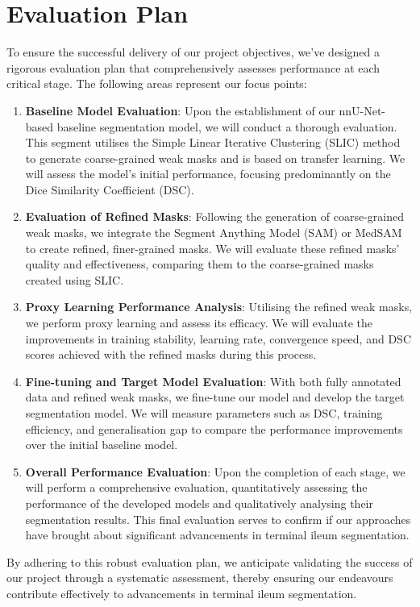 \section{Evaluation Plan}
To ensure the successful delivery of our project objectives, we've designed a rigorous evaluation plan that comprehensively assesses performance at each critical stage. The following areas represent our focus points:

\begin{enumerate}
    \item \textbf{Baseline Model Evaluation}: Upon the establishment of our nnU-Net-based baseline segmentation model, we will conduct a thorough evaluation. This segment utilises the Simple Linear Iterative Clustering (SLIC) method to generate coarse-grained weak masks and is based on transfer learning. We will assess the model's initial performance, focusing predominantly on the Dice Similarity Coefficient (DSC).
    \item \textbf{Evaluation of Refined Masks}: Following the generation of coarse-grained weak masks, we integrate the Segment Anything Model (SAM) or MedSAM to create refined, finer-grained masks. We will evaluate these refined masks' quality and effectiveness, comparing them to the coarse-grained masks created using SLIC.
    \item \textbf{Proxy Learning Performance Analysis}: Utilising the refined weak masks, we perform proxy learning and assess its efficacy. We will evaluate the improvements in training stability, learning rate, convergence speed, and DSC scores achieved with the refined masks during this process.
    \item \textbf{Fine-tuning and Target Model Evaluation}: With both fully annotated data and refined weak masks, we fine-tune our model and develop the target segmentation model. We will measure parameters such as DSC, training efficiency, and generalisation gap to compare the performance improvements over the initial baseline model.
    \item \textbf{Overall Performance Evaluation}: Upon the completion of each stage, we will perform a comprehensive evaluation, quantitatively assessing the performance of the developed models and qualitatively analysing their segmentation results. This final evaluation serves to confirm if our approaches have brought about significant advancements in terminal ileum segmentation.
\end{enumerate}
By adhering to this robust evaluation plan, we anticipate validating the success of our project through a systematic assessment, thereby ensuring our endeavours contribute effectively to advancements in terminal ileum segmentation.